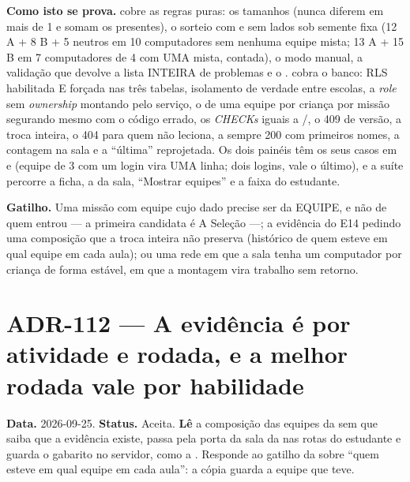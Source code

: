 \textbf{Como isto se prova.}  cobre
as regras puras: os tamanhos (nunca diferem em mais de 1 e somam os presentes),
o sorteio com e sem lados sob semente fixa (12 A + 8 B + 5 neutros em 10
computadores sem nenhuma equipe mista; 13 A + 15 B em 7 computadores de 4 com
UMA mista, contada), o modo manual, a validação que devolve a lista INTEIRA de
problemas e o . 
cobra o banco: RLS habilitada E forçada nas três tabelas, isolamento de verdade
entre escolas, a \emph{role} sem \emph{ownership} montando pelo serviço, o
 de uma equipe por criança por missão segurando mesmo com o código
errado, os \emph{CHECKs} iguais a /, o 409 de versão, a
troca inteira, o 404 para quem não leciona, a  sempre 200 com
primeiros nomes, a contagem na sala e a \enquote{última} reprojetada. Os dois
painéis têm os seus casos em  e
 (equipe de 3 com um login vira UMA linha; dois
logins, vale o último), e a suíte 
percorre a ficha, a  da sala, \enquote{Mostrar equipes} e a faixa do
estudante.

\textbf{Gatilho.} Uma missão com equipe cujo dado precise ser da EQUIPE, e não
de quem entrou --- a primeira candidata é A Seleção ---; a evidência do E14
pedindo uma composição que a troca inteira não preserva (histórico de quem
esteve em qual equipe em cada aula); ou uma rede em que a sala tenha um
computador por criança de forma estável, em que a montagem vira trabalho sem
retorno.

\section{ADR-112 --- A evidência é por atividade e rodada, e a melhor rodada vale por habilidade}
\label{adr:evidencia-pedagogica}

\textbf{Data.} 2026-09-25. \textbf{Status.} Aceita.
\textbf{Lê} a composição das equipes da  sem que 
saiba que a evidência existe, passa pela porta da sala da  nas
rotas do estudante e guarda o gabarito no servidor, como a .
Responde ao gatilho da  sobre \enquote{quem esteve em qual equipe
em cada aula}: a cópia guarda a equipe que teve.

